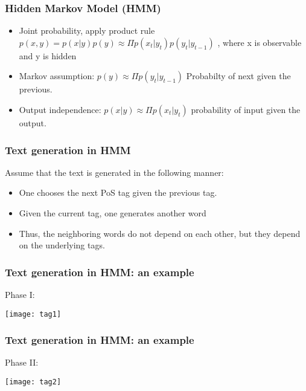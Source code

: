 \begin{frame}[fragile]
  \frametitle{Hidden Markov Model (HMM)}
  \begin{itemize}
\item Joint probability, apply product rule $p(x,y) = p(x|y)p(y) \approx \Pi p(x_t|y_t)p(y_t|y_{t-1})$  , where x is observable and y is hidden
\item Markov assumption: $p(y) \approx \Pi p(y_t | y_{t-1} )$ Probabilty of next given the previous.
\item Output independence: $p(x|y) \approx \Pi p(x_t | y_{t} )$ probability of input given the output.
  	  \end{itemize}
 \end{frame} 
 
 
\begin{frame}[fragile]
  \frametitle{Text generation in HMM}
  Assume that the text is generated in the following manner: 
  \begin{itemize}
\item One chooses the next PoS tag given the previous tag.
\item Given the current tag, one generates another word
\item Thus, the neighboring words do not depend on each other, but 
they depend on the underlying tags. 
  	  \end{itemize}
 \end{frame}

 
\begin{frame}[fragile]
  \frametitle{Text generation in HMM: an example}
Phase I:
\begin{center}
\texttt{[image: tag1]}
\end{center}
 \end{frame} 
  
\begin{frame}[fragile]
  \frametitle{Text generation in HMM: an example}
Phase II:
\begin{center}
\texttt{[image: tag2]}
\end{center}
 \end{frame} 
  
